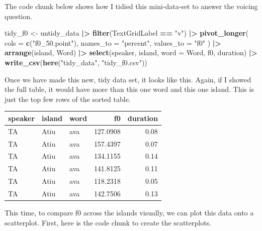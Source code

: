 \documentclass[
  ,man,floatsintext]{apa6}
\newenvironment{Shaded}{\begin{snugshade}}{\end{snugshade}}
\newcommand{\AttributeTok}[1]{\textcolor[rgb]{0.13,0.29,0.53}{#1}}
\newcommand{\FunctionTok}[1]{\textcolor[rgb]{0.13,0.29,0.53}{\textbf{#1}}}
\newcommand{\NormalTok}[1]{#1}
\newcommand{\OtherTok}[1]{\textcolor[rgb]{0.56,0.35,0.01}{#1}}
\newcommand{\SpecialCharTok}[1]{\textcolor[rgb]{0.81,0.36,0.00}{\textbf{#1}}}
\newcommand{\StringTok}[1]{\textcolor[rgb]{0.31,0.60,0.02}{#1}}
\begin{document}
The code chunk below shows how I tidied this mini-data-set to answer the voicing question.

\begin{Shaded}
\begin{Highlighting}[]
\NormalTok{tidy\_f0 }\OtherTok{\textless{}{-}}\NormalTok{ untidy\_data }\SpecialCharTok{|\textgreater{}}
  \FunctionTok{filter}\NormalTok{(TextGridLabel }\SpecialCharTok{==} \StringTok{"v"}\NormalTok{) }\SpecialCharTok{|\textgreater{}}
  \FunctionTok{pivot\_longer}\NormalTok{(}
    \AttributeTok{cols =} \FunctionTok{c}\NormalTok{(}\StringTok{"f0\_50.point"}\NormalTok{), }
    \AttributeTok{names\_to =} \StringTok{"percent"}\NormalTok{,}
    \AttributeTok{values\_to =} \StringTok{"f0"}
\NormalTok{  ) }\SpecialCharTok{|\textgreater{}}
  \FunctionTok{arrange}\NormalTok{(island, Word) }\SpecialCharTok{|\textgreater{}}  
  \FunctionTok{select}\NormalTok{(speaker, island, }\AttributeTok{word =}\NormalTok{ Word, f0, duration) }\SpecialCharTok{|\textgreater{}}
  \FunctionTok{write\_csv}\NormalTok{(}\FunctionTok{here}\NormalTok{(}\StringTok{"tidy\_data"}\NormalTok{, }\StringTok{"tidy\_f0.csv"}\NormalTok{))}
\end{Highlighting}
\end{Shaded}

Once we have made this new, tidy data set, it looks like this. Again, if I showed the full table, it would have more than this one word and this one island. This is just the top few rows of the sorted table.

\begin{tabular}{l|l|l|r|r}
\hline
speaker & island & word & f0 & duration\\
\hline
TA & Atiu & ava & 127.0908 & 0.08\\
\hline
TA & Atiu & ava & 157.4397 & 0.07\\
\hline
TA & Atiu & ava & 134.1155 & 0.14\\
\hline
TA & Atiu & ava & 141.8125 & 0.11\\
\hline
TA & Atiu & ava & 118.2318 & 0.05\\
\hline
TA & Atiu & ava & 142.7506 & 0.13\\
\hline
\end{tabular}

This time, to compare f0 across the islands visually, we can plot this data onto a scatterplot. First, here is the code chunk to create the scatterplots.
\end{document}

